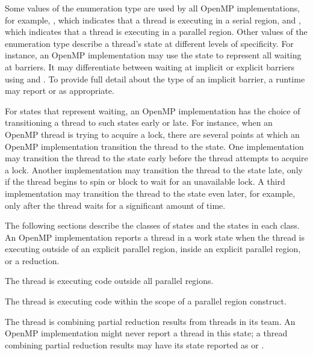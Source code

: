 Some values of the enumeration type  are used by all
OpenMP implementations,
for example, ,
which indicates that a thread is executing in a serial region, and
,
which indicates that a thread is executing in a parallel region.
Other values of the enumeration type describe a thread's state at
different levels of specificity.
For instance, an OpenMP implementation may use
the state   to represent all
waiting at barriers. It may differentiate between waiting at implicit or explicit barriers using
 and .
To provide full detail about the type of an implicit barrier, a runtime may report
 or
 as appropriate.

For states that represent waiting, an OpenMP implementation has the
choice of transitioning a thread to such states early or late.
For instance, when an OpenMP thread is trying to acquire a lock,
there are several points at which an OpenMP implementation
transition the thread to the  state.
One implementation may transition the thread to the state
early before the thread attempts to acquire a
lock. Another implementation may transition the thread to the state
late, only if the thread begins to spin or
block to wait for an unavailable lock. A third implementation
may transition the thread to the state even later, for example, only
after the thread waits for a significant amount of time.

The following sections describe the classes of states and the states in each class.
An OpenMP implementation reports a thread in a work state
when the thread is 
executing outside of an explicit parallel region, inside an explicit parallel region, or a reduction.

\begin{description}

\item {}

  The thread is executing code outside all parallel regions.

\item {}

  The thread is executing code within the scope of a parallel region construct.

\sloppy
\item {}

  The thread is combining partial reduction results from threads in its team.
  An OpenMP implementation
  might never report a thread in this state; a thread
  combining partial reduction results may have its state reported as
   or .

\end{description}


